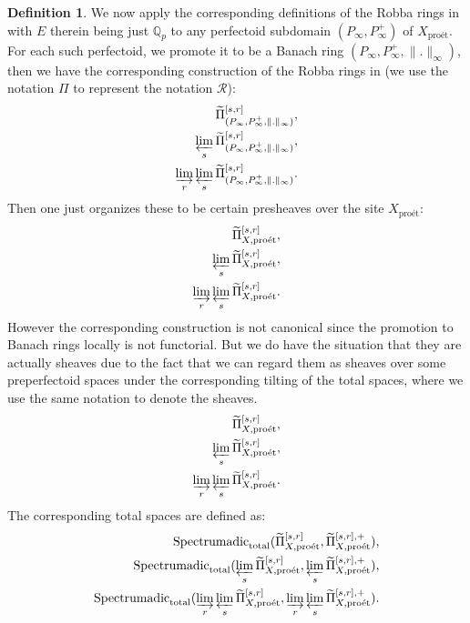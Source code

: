 \documentclass[11pt]{book}
\theoremstyle{definition}
\newtheorem{definition}[theorem]{Definition}
\numberwithin{equation}{section}
\begin{document}
\begin{definition}
We now apply the corresponding definitions of the Robba rings in \cite[Definition 4.1.1]{12KL2} with $E$ therein being just $\mathbb{Q}_p$ to any perfectoid subdomain $(P_\infty,P^+_\infty)$ of $X_\text{pro\'et}$. For each such perfectoid, we promote it to be a Banach ring $(P_\infty,P^+_\infty,\|.\|_{\infty})$, then we have the corresponding construction of the Robba rings in \cite[Definition 4.1.1]{12KL2} (we use the notation $\Pi$ to represent the notation $\mathcal{R}$):
\begin{align}
\widetilde{\Pi}^{[s,r]}_{(P_\infty,P^+_\infty,\|.\|_{\infty})},\\
\varprojlim_s \widetilde{\Pi}^{[s,r]}_{(P_\infty,P^+_\infty,\|.\|_{\infty})},\\
\varinjlim_r \varprojlim_s \widetilde{\Pi}^{[s,r]}_{(P_\infty,P^+_\infty,\|.\|_{\infty})}.	
\end{align}
Then one just organizes these to be certain presheaves over the site $X_\text{pro\'et}$:
\begin{align}
\widetilde{\Pi}^{[s,r]}_{X,\text{pro\'et}},\\
\varprojlim_s \widetilde{\Pi}^{[s,r]}_{X,\text{pro\'et}},\\
\varinjlim_r \varprojlim_s \widetilde{\Pi}^{[s,r]}_{X,\text{pro\'et}}.	
\end{align}	
However the corresponding construction is not canonical since the promotion to Banach rings locally is not functorial. But we do have the situation that they are actually sheaves due to the fact that we can regard them as sheaves over some preperfectoid spaces under the corresponding tilting of the total spaces, where we use the same notation to denote the sheaves.
\begin{align}
\widetilde{\Pi}^{[s,r]}_{X,\text{pro\'et}},\\
\varprojlim_s \widetilde{\Pi}^{[s,r]}_{X,\text{pro\'et}},\\
\varinjlim_r \varprojlim_s \widetilde{\Pi}^{[s,r]}_{X,\text{pro\'et}}.	
\end{align}	
The corresponding total spaces are defined as:
\begin{align}
\mathrm{Spectrumadic}_{\mathrm{total}}(\widetilde{\Pi}^{[s,r]}_{X,\text{pro\'et}},\widetilde{\Pi}^{[s,r],+}_{X,\text{pro\'et}}),\\
\mathrm{Spectrumadic}_{\mathrm{total}}(\varprojlim_s \widetilde{\Pi}^{[s,r]}_{X,\text{pro\'et}},\varprojlim_s \widetilde{\Pi}^{[s,r],+}_{X,\text{pro\'et}}),\\
\mathrm{Spectrumadic}_{\mathrm{total}}(\varinjlim_r \varprojlim_s \widetilde{\Pi}^{[s,r]}_{X,\text{pro\'et}},\varinjlim_r \varprojlim_s \widetilde{\Pi}^{[s,r],+}_{X,\text{pro\'et}}).	
\end{align}	
\end{definition}
\end{document}
